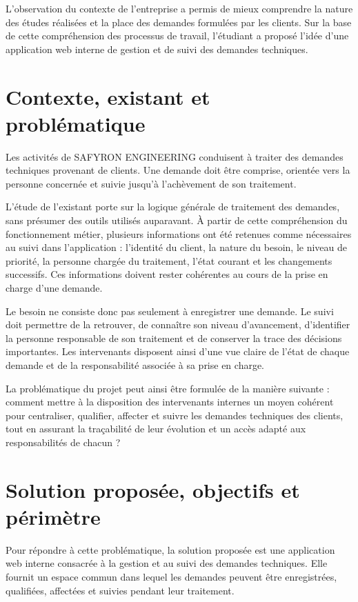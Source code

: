 L'observation du contexte de l'entreprise a permis de mieux comprendre la nature des études réalisées et la place des demandes formulées par les clients. Sur la base de cette compréhension des processus de travail, l'étudiant a proposé l'idée d'une application web interne de gestion et de suivi des demandes techniques.

\section{Contexte, existant et problématique}
\label{sec:01-contexte-existant-problematique}

Les activités de SAFYRON ENGINEERING conduisent à traiter des demandes techniques provenant de clients. Une demande doit être comprise, orientée vers la personne concernée et suivie jusqu'à l'achèvement de son traitement.

L'étude de l'existant porte sur la logique générale de traitement des demandes, sans présumer des outils utilisés auparavant. À partir de cette compréhension du fonctionnement métier, plusieurs informations ont été retenues comme nécessaires au suivi dans l'application : l'identité du client, la nature du besoin, le niveau de priorité, la personne chargée du traitement, l'état courant et les changements successifs. Ces informations doivent rester cohérentes au cours de la prise en charge d'une demande.

Le besoin ne consiste donc pas seulement à enregistrer une demande. Le suivi doit permettre de la retrouver, de connaître son niveau d'avancement, d'identifier la personne responsable de son traitement et de conserver la trace des décisions importantes. Les intervenants disposent ainsi d'une vue claire de l'état de chaque demande et de la responsabilité associée à sa prise en charge.

La problématique du projet peut ainsi être formulée de la manière suivante : comment mettre à la disposition des intervenants internes un moyen cohérent pour centraliser, qualifier, affecter et suivre les demandes techniques des clients, tout en assurant la traçabilité de leur évolution et un accès adapté aux responsabilités de chacun ?

\section{Solution proposée, objectifs et périmètre}
\label{sec:01-solution-objectifs-perimetre}

Pour répondre à cette problématique, la solution proposée est une application web interne consacrée à la gestion et au suivi des demandes techniques. Elle fournit un espace commun dans lequel les demandes peuvent être enregistrées, qualifiées, affectées et suivies pendant leur traitement.

